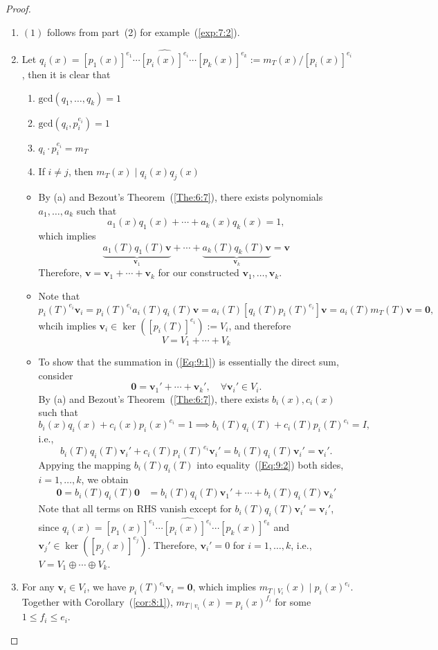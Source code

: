 \begin{proof}
\begin{enumerate}
\item
$(1)$ follows from part~(2) for example~(\ref{exp:7:2}).
\item
Let $q_i(x)=[p_1(x)]^{e_1}\cdots\widehat{[p_i(x)]^{e_i}}\cdots[p_k(x)]^{e_k}:=m_T(x)/[p_i(x)]^{e_i}$, then it is clear that
\begin{enumerate}
\item
$\text{gcd}(q_1,\dots,q_k)=1$
\item
$\text{gcd}(q_i,p_i^{e_i})=1$
\item
$q_i\cdot p_i^{e_i}=m_T$
\item
If $i\ne j$, then $m_T(x)\mid q_i(x)q_j(x)$
\end{enumerate}

\begin{itemize}
\item
By (a) and Bezout's Theorem~(\ref{The:6:7}), there exists polynomials $a_1,\dots,a_k$ such that
\[
a_1(x)q_1(x)+\cdots+a_k(x)q_k(x)=1,
\]
which implies
\[
\underbrace{a_1(T)q_1(T)\bm v}_{\bm v_1}+\cdots+\underbrace{a_k(T)q_k(T)\bm v}_{\bm v_k}=\bm v
\]
Therefore, $\bm v=\bm v_1+\cdots+\bm v_k$ for our constructed $\bm v_1,\dots,\bm v_k$.
\item
Note that
\[
p_i(T)^{e_i}\bm v_i
=
p_i(T)^{e_i}a_i(T)q_i(T)\bm v
=a_i(T)[q_i(T)p_i(T)^{e_i}]\bm v=a_i(T)m_T(T)\bm v=\bm0,
\]
whcih implies $\bm v_i\in\ker([p_i(T)]^{e_i}):=V_i$, and therefore
\begin{equation}\label{Eq:9:1}
V=V_1+\cdots+V_k
\end{equation}
\item
To show that the summation in (\ref{Eq:9:1}) is essentially the direct sum, consider 
\begin{equation}\label{Eq:9:2}
\bm0=\bm v_1'+\cdots+\bm v_k',\quad
\forall \bm v_i'\in V_i.
\end{equation}
By (a) and Bezout's Theorem~(\ref{The:6:7}), there exists $b_i(x),c_i(x)$ such that
\[
b_i(x)q_i(x)+c_i(x)p_i(x)^{e_i}=1\implies
b_i(T)q_i(T)+c_i(T)p_i(T)^{e_i}=I,
\]
i.e.,
\[
b_i(T)q_i(T)\bm v_i'+c_i(T)p_i(T)^{e_i}\bm v_i'=b_i(T)q_i(T)\bm v_i'=\bm v_i'.
\]
Appying the mapping $b_i(T)q_i(T)$ into equality~(\ref{Eq:9:2}) both sides, $i=1,\dots,k$, we obtain
\begin{align*}
\bm0=b_i(T)q_i(T)\bm0&=
b_i(T)q_i(T)\bm v_1'+\cdots+b_i(T)q_i(T)\bm v_k'
\end{align*}
Note that all terms on RHS vanish except for $b_i(T)q_i(T)\bm v_i'=\bm v_i'$, since $q_i(x)=[p_1(x)]^{e_1}\cdots\widehat{[p_i(x)]^{e_i}}\cdots[p_k(x)]^{e_k}$ and $\bm v_j'\in\ker([p_j(x)]^{e_j})$.
Therefore, $\bm v_i'=0$ for $i=1,\dots,k$, i.e., $V = V_1\oplus \cdots\oplus V_k$.
\end{itemize}
\item
For any $\bm v_i\in V_i$, we have $p_i(T)^{e_i}\bm v_i=\bm0$, which implies $m_{T\mid V_i}(x)\mid p_i(x)^{e_i}$. Together with Corollary~(\ref{cor:8:1}), $m_{T\mid v_i}(x)=p_i(x)^{f_i}$ for some $1\le f_i\le e_i$.


\end{enumerate}
\end{proof}
